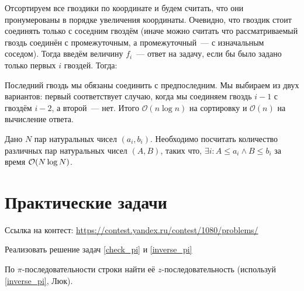 \documentclass[addpoints]{exam}
\begin{document}
\begin{questions}
\begin{solution}
Отсортируем все гвоздики по координате и будем считать, что они пронумерованы в порядке увеличения координаты. Очевидно, что гвоздик стоит соединять только с соседним гвоздём (иначе можно считать что рассматриваемый гвоздь соединён с промежуточным, а промежуточный~---  с изначальным соседом). Тогда введём величину $f_i$~--- ответ на задачу, если бы было задано только первых $i$ гвоздей. Тогда:

\begin{center}
\end{center}

Последний гвоздь мы обязаны соединить с предпоследним. Мы выбираем из двух вариантов: первый соответствует случаю, когда мы соединяем гвоздь $i-1$ с гвоздём $i-2$, а второй~--- нет. Итого $\mathcal{O}(n \log{n})$ на сортировку и $\mathcal{O}(n)$ на вычисление ответа.

\end{solution}

\question[\half] Дано $N$ пар натуральных чисел $(a_i, b_i)$. Необходимо посчитать количество различных пар натуральных чисел $(A, B)$, таких что, $\exists i: A \leqslant a_i \land B \leqslant b_i$ за время $\mathcal{O}(N \log{N})$.

\section{Практические задачи}

Ссылка на контест: \url{https://contest.yandex.ru/contest/1080/problems/}

\question[1] Реализовать решение задач \ref{check_pi} и \ref{inverse_pi}

\question[1] По $\pi$-последовательности строки найти её $z$-последовательность (используй \ref{inverse_pi}, Люк). 
 
\begin{center}
\pointtable[h][questions]
\end{center}

\end{questions}
\end{document}
